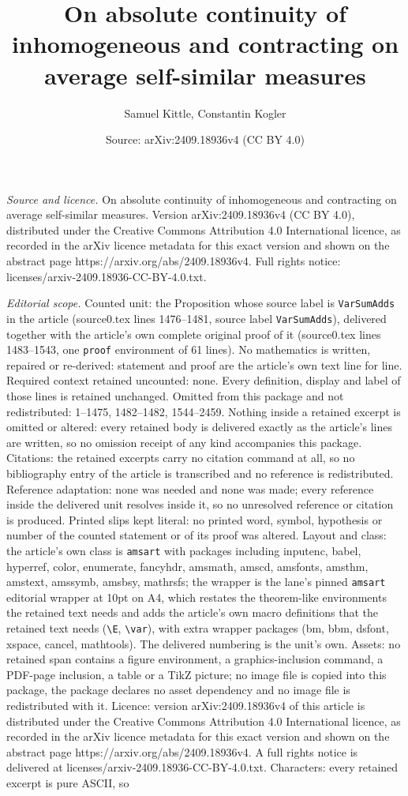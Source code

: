 \documentclass[10pt,a4paper]{amsart}
\title[On absolute continuity of inhomogeneous and contracting on a]{On absolute continuity of inhomogeneous and contracting on average self-similar measures}
\author{Samuel Kittle, Constantin Kogler}
\date{Source: arXiv:2409.18936v4 (CC BY 4.0)}
\begin{document}
\maketitle

\noindent\emph{Source and licence.} On absolute continuity of inhomogeneous and contracting on average self-similar measures. Version arXiv:2409.18936v4 (CC BY 4.0), distributed under the Creative Commons Attribution 4.0 International licence, as recorded in the arXiv licence metadata for this exact version and shown on the abstract page https://arxiv.org/abs/2409.18936v4. Full rights notice: licenses/arxiv-2409.18936-CC-BY-4.0.txt.\par\smallskip

\noindent\textit{Editorial scope.} Counted unit: the Proposition whose source label is \texttt{VarSumAdds} in the article (source0.tex lines 1476--1481, source label \texttt{VarSumAdds}), delivered together with the article's own complete original proof of it (source0.tex lines 1483--1543, one \texttt{proof} environment of 61 lines). No mathematics is written, repaired or re-derived: statement and proof are the article's own text line for line. Required context retained uncounted: none. Every definition, display and label of those lines is retained unchanged. Omitted from this package and not redistributed: 1--1475, 1482--1482, 1544--2459. Nothing inside a retained excerpt is omitted or altered: every retained body is delivered exactly as the article's lines are written, so no omission receipt of any kind accompanies this package. Citations: the retained excerpts carry no citation command at all, so no bibliography entry of the article is transcribed and no reference is redistributed. Reference adaptation: none was needed and none was made; every reference inside the delivered unit resolves inside it, so no unresolved reference or citation is produced. Printed slips kept literal: no printed word, symbol, hypothesis or number of the counted statement or of its proof was altered. Layout and class: the article's own class is \texttt{amsart} with packages including inputenc, babel, hyperref, color, enumerate, fancyhdr, amsmath, amscd, amsfonts, amsthm, amstext, amssymb, amsbsy, mathrsfs; the wrapper is the lane's pinned \texttt{amsart} editorial wrapper at 10pt on A4, which restates the theorem-like environments the retained text needs and adds the article's own macro definitions that the retained text needs (\texttt{\textbackslash E}, \texttt{\textbackslash var}), with extra wrapper packages (bm, bbm, dsfont, xspace, cancel, mathtools). The delivered numbering is the unit's own. Assets: no retained span contains a figure environment, a graphics-inclusion command, a PDF-page inclusion, a table or a TikZ picture; no image file is copied into this package, the package declares no asset dependency and no image file is redistributed with it. Licence: version arXiv:2409.18936v4 of this article is distributed under the Creative Commons Attribution 4.0 International licence, as recorded in the arXiv licence metadata for this exact version and shown on the abstract page https://arxiv.org/abs/2409.18936v4. A full rights notice is delivered at licenses/arxiv-2409.18936-CC-BY-4.0.txt. Characters: every retained excerpt is pure ASCII, so 
\end{document}
